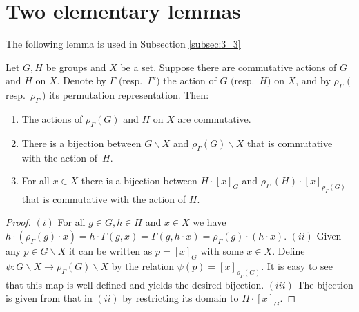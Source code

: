\appendix
\section{Two elementary lemmas}\label{app:A}
The following lemma is used in Subsection \ref{subsec:3_3}
\begin{lemma}\label{lem:apr8_2}
Let $G, H$ be groups and $X$ be a set.
Suppose there are commutative actions of $G$ and $H$ on $X$.
Denote by $\varGamma$ $($resp.~$\varGamma')$ the action of $G$ $($resp.~$H)$ on $X$, and by $\rho_{\varGamma}$ $($resp.~$\rho_{\varGamma'})$
its permutation representation.
Then:
\begin{enumerate}\itemsep=0pt
\item The actions of $\rho_{\varGamma} (G)$ and $H$ on $X$ are commutative.
\item There is a bijection between $G \backslash X$ and $\rho_{\varGamma} (G) \backslash X$ that is commutative with the
action of~$H$.
\item For all $x \in X$ there is a bijection between $H \cdot [x]_G$ and $\rho_{\varGamma'}(H) \cdot  [x]_{\rho_{\varGamma}(G)}$
that is commutative with the action of $H$.
\end{enumerate}
\end{lemma}
\begin{proof}
$(i)$ For all $g \in G, h \in H$ and $x \in X$ we have $h \cdot (\rho_{\varGamma} (g) \cdot x) = h \cdot \varGamma (g, x)
= \varGamma (g, h \cdot x) = \rho_{\varGamma} (g) \cdot (h \cdot x)$.
$(ii)$ Given any $p \in G \backslash X$ it can be written as $p = [x]_G$ with some $x \in X$.
Def\/ine $\psi: G \backslash X \rightarrow \rho_{\varGamma} (G) \backslash X$ by the relation $\psi (p) = [x]_{\rho_{\varGamma} (G)}$.
It is easy to see that this map is well-def\/ined and yields the desired bijection.
$(iii)$ The bijection is given from that in $(ii)$ by restricting its domain to $H \cdot [x]_G$.
\end{proof}


